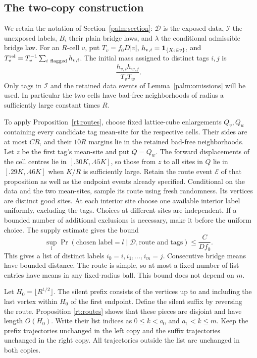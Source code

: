 \subsection{The two-copy construction}

We retain the notation of Section~\ref{palm:section}: $\mathcal D$ is the
exposed data, $\mathcal I$ the unexposed labels, $B_i$ their plain bridge
laws, and $\lambda$ the conditional admissible bridge law.  For an $R$-cell
$v$, put $T_v=f_0D|v|$, $h_{v,i}=\mathbf 1_{\{X_i\in v\}}$, and
$T_v^{\rm rel}=T_v^{-1}\sum_{i\ {\rm flagged}}h_{v,i}$.
The initial mass assigned to distinct tags $i,j$ is
\begin{equation}\label{long:tag-weight}
             \frac{h_{v,i}h_{w,j}}{T_vT_w}.
\end{equation}
Only tags in $\mathcal I$ and the retained data events of
Lemma~\ref{palm:omissions} will be used.  In particular the two cells have
bad-free neighborhoods of radius a sufficiently large constant times $R$.

To apply Proposition~\ref{rt:routes}, choose fixed lattice-cube
enlargements $Q_v,Q_w$ containing every candidate tag mean-site for the
respective cells.  Their sides are at most $C R$, and their $10R$ margins
lie in the retained bad-free neighborhoods.  Let $z$ be the first tag's
mean-site and put $Q=Q_w$.  The forward
displacements of the cell centres lie in $[.30K,.45K]$, so those from $z$
to all sites in $Q$ lie in $[.29K,.46K]$ when $K/R$ is sufficiently large.
Retain the route event $\mathcal E$ of that proposition as well as the
endpoint events already specified.  Conditional on the data and the two
mean-sites, sample its route using fresh randomness.  Its vertices are
distinct good sites.
At each interior site choose one available interior label uniformly,
excluding the tags.  Choices at different sites are independent.  If a
bounded number of additional exclusions is necessary, make it before the
uniform choice.  The supply estimate gives the bound
\begin{equation}\label{long:label-atom}
       \sup_l\Pr(\text{chosen label}=l\mid\mathcal D,
                         \text{route and tags})
                  \le \frac{C}{Df_0}.
\end{equation}
This gives a list of distinct labels
$i_0=i,i_1,\ldots,i_m=j$.  Consecutive bridge means have bounded distance.
The route is simple, so at most a fixed number of list entries have means
in any fixed-radius ball.  This bound does not depend on $m$.

Let $H_0=\lfloor R^{1/2}\rfloor$.  The silent prefix consists of the
vertices up to and including the last vertex within $H_0$ of the first
endpoint.  Define the silent suffix by reversing the route.  Proposition
\ref{rt:routes} shows that these pieces are disjoint and have length
$O(H_0)$.  Write their list indices as $0\le k<a_0$ and
$a_1<k\le m$.  Keep the prefix trajectories unchanged in the left copy
and the suffix trajectories unchanged in the right copy.  All trajectories
outside the list are unchanged in both copies.

